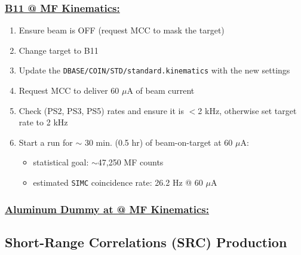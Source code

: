 \documentclass{article}
\begin{document}
\subsubsection*{\underline{B11 @ MF Kinematics:}}
\begin{enumerate}
\item Ensure beam is OFF (request MCC to mask the target)
\item Change target to B11
\item Update the \texttt{DBASE/COIN/STD/standard.kinematics} with the new settings
\item Request MCC to deliver 60 $\mu$A of beam current
\item Check (PS2, PS3, PS5) rates and ensure it is $<$2 kHz, otherwise set target rate to 2 kHz
\item Start a run for $\sim$ 30 min. (0.5 hr) of beam-on-target at 60 $\mu$A:
\begin{itemize}
    \item statistical goal: $\sim$47,250 MF counts
    \item estimated \texttt{SIMC} coincidence rate: 26.2 Hz @ 60 $\mu$A
\end{itemize}
\end{enumerate}

\subsubsection*{\underline{Aluminum Dummy at @ MF Kinematics:}}
\begin{itemize}
\end{itemize}

\subsection{Short-Range Correlations (SRC) Production}
\end{document}
